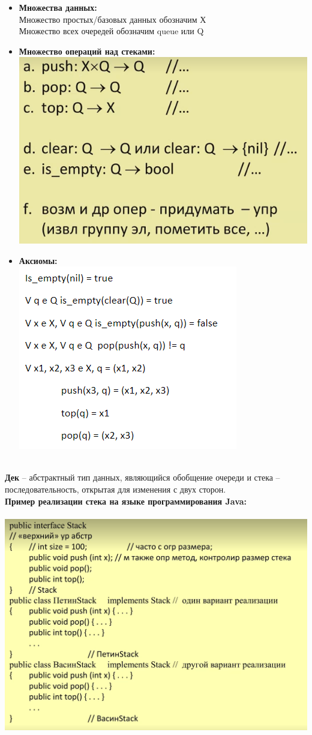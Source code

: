   \begin{itemize}
    \item 
      \textbf{Множества данных:}\\
      Множество простых/базовых данных обозначим Х\\
      Множество всех очередей обозначим queue или Q
    \item
      \textbf{Множество операций над стеками:}\\ 
      \includegraphics[width=0.7\linewidth]{pictures/5_4.PNG}
    \item
      \textbf{Аксиомы:}\\
      \includegraphics[width=0.7\linewidth]{pictures/5_5.PNG}
  \end{itemize}\\

  \textbf{Дек} – абстрактный тип данных, являющийся обобщение очереди и стека – последовательность, открытая для изменения с двух сторон.\\

  \textbf{Пример реализации стека на языке программирования Java:}\\ \\
  \includegraphics[width=0.7\linewidth]{pictures/5_6.PNG}\\ \\

